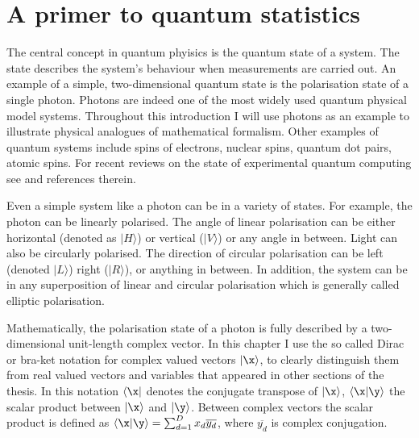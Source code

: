
\section{A primer to quantum statistics}

The central concept in quantum phyisics is the quantum state of a system. The state describes the system's behaviour when measurements are carried out. An example of a simple, two-dimensional quantum state is the polarisation state of a single photon. Photons are indeed one of the most widely used quantum physical model systems. Throughout this introduction I will use photons as an example to illustrate physical analogues of mathematical formalism. Other examples of quantum systems include spins of electrons, nuclear spins, quantum dot pairs, atomic spins. For recent reviews on the state of experimental quantum computing see \citep{Ladd2010} and references therein.

Even a simple system like a photon can be in a variety of states. For example, the photon can be linearly polarised. The angle of linear polarisation can be either horizontal (denoted as $\vert H\rangle$) or vertical ($\vert V \rangle$) or any angle in between. Light can also be circularly		 polarised. The direction of circular polarisation can be left (denoted $\vert L\rangle$) right ($\vert R\rangle$), or anything in between. In addition, the system can be in any superposition of linear and circular polarisation which is generally called elliptic polarisation.

Mathematically, the polarisation state of a photon is fully described by a two-dimensional unit-length complex vector. In this chapter I use the so called Dirac or bra-ket notation \citep{Dirac1939} for complex valued vectors $\vert\x\rangle$, to clearly distinguish them from real valued vectors and variables that appeared in other sections of the thesis. In this notation $\langle\x\vert$ denotes the conjugate transpose of $\vert\x\rangle$, $\langle\x\vert\y\rangle$ the scalar product between $\vert\x\rangle$ and $\vert\y\rangle$. Between complex vectors the scalar product is defined as $\langle\x\vert\y\rangle = \sum_{d=1}^{D} x_d \overline{y_d}$, where $\overline{y_d}$ is complex conjugation.


